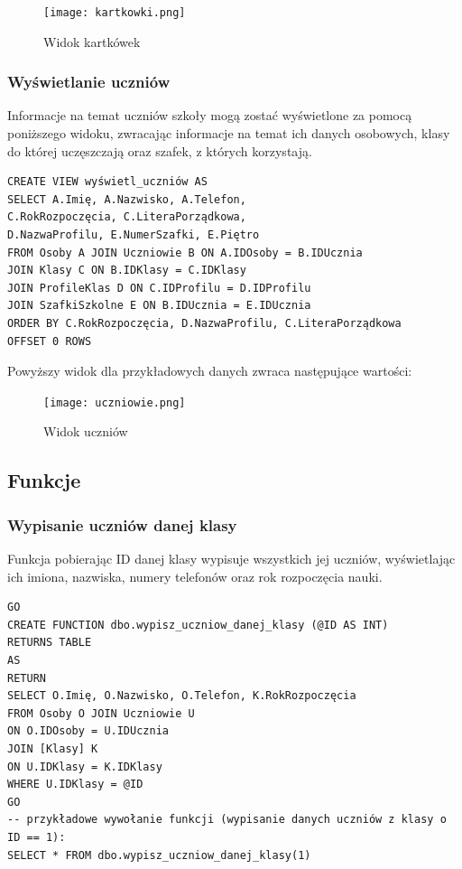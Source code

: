 \documentclass[60pt]{article}
\begin{document}
\begin{figure}[h]
  \texttt{[image: kartkowki.png]}
  \caption{Widok kartkówek}
  \label{Widok kartkówek}
\end{figure}

\subsubsection{Wyświetlanie uczniów}

Informacje na temat uczniów szkoły mogą zostać wyświetlone za pomocą poniższego widoku, zwracając informacje na temat ich danych osobowych, klasy do której uczęszczają oraz szafek, z których korzystają.

\begin{verbatim}
CREATE VIEW wyświetl_uczniów AS
SELECT A.Imię, A.Nazwisko, A.Telefon, 
C.RokRozpoczęcia, C.LiteraPorządkowa, 
D.NazwaProfilu, E.NumerSzafki, E.Piętro
FROM Osoby A JOIN Uczniowie B ON A.IDOsoby = B.IDUcznia
JOIN Klasy C ON B.IDKlasy = C.IDKlasy
JOIN ProfileKlas D ON C.IDProfilu = D.IDProfilu
JOIN SzafkiSzkolne E ON B.IDUcznia = E.IDUcznia
ORDER BY C.RokRozpoczęcia, D.NazwaProfilu, C.LiteraPorządkowa
OFFSET 0 ROWS
\end{verbatim}

Powyższy widok dla przykładowych danych zwraca następujące wartości:

\begin{figure}[h]
  \texttt{[image: uczniowie.png]}
  \caption{Widok uczniów}
  \label{Widok uczniów}
\end{figure}

\subsection{Funkcje}

\subsubsection{Wypisanie uczniów danej klasy}

Funkcja pobierając ID danej klasy wypisuje wszystkich jej uczniów, wyświetlając ich imiona, nazwiska, numery telefonów oraz rok rozpoczęcia nauki. 

\begin{verbatim}
GO
CREATE FUNCTION dbo.wypisz_uczniow_danej_klasy (@ID AS INT)
RETURNS TABLE
AS
RETURN
SELECT O.Imię, O.Nazwisko, O.Telefon, K.RokRozpoczęcia
FROM Osoby O JOIN Uczniowie U
ON O.IDOsoby = U.IDUcznia
JOIN [Klasy] K
ON U.IDKlasy = K.IDKlasy
WHERE U.IDKlasy = @ID
GO
-- przykładowe wywołanie funkcji (wypisanie danych uczniów z klasy o ID == 1):
SELECT * FROM dbo.wypisz_uczniow_danej_klasy(1)
\end{verbatim}
\end{document}
